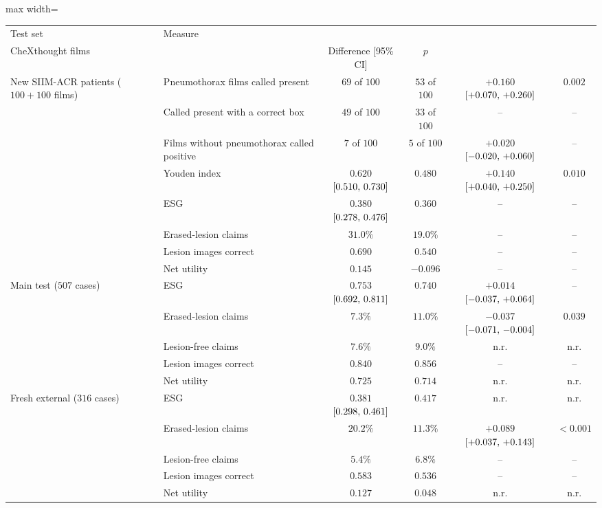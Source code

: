 \begin{table}[!htbp]
\vspace{0.6em}
\begin{adjustbox}{max width=\linewidth}
\begin{tabular}{ll cc cc}
\toprule
Test set & Measure & \shortstack{\msp{} with\\CheXthought films} & \msp{} & Difference [95\% CI] & $p$ \\
\midrule
New SIIM-ACR patients ($100 + 100$ films) & Pneumothorax films called present & $69$ of $100$ & $53$ of $100$ & $+0.160$ $[+0.070,\,+0.260]$ & $0.002$ \\
 & Called present with a correct box & $49$ of $100$ & $33$ of $100$ & -- & -- \\
 & Films without pneumothorax called positive & $7$ of $100$ & $5$ of $100$ & $+0.020$ $[-0.020,\,+0.060]$ & -- \\
 & Youden index & $0.620$ $[0.510,\,0.730]$ & $0.480$ & $+0.140$ $[+0.040,\,+0.250]$ & $0.010$ \\
 & ESG & $0.380$ $[0.278,\,0.476]$ & $0.360$ & -- & -- \\
 & Erased-lesion claims & $31.0\%$ & $19.0\%$ & -- & -- \\
 & Lesion images correct & $0.690$ & $0.540$ & -- & -- \\
 & Net utility & $0.145$ & $-0.096$ & -- & -- \\
\midrule
Main test ($507$ cases) & ESG & $0.753$ $[0.692,\,0.811]$ & $0.740$ & $+0.014$ $[-0.037,\,+0.064]$ & -- \\
 & Erased-lesion claims & $7.3\%$ & $11.0\%$ & $-0.037$ $[-0.071,\,-0.004]$ & $0.039$ \\
 & Lesion-free claims & $7.6\%$ & $9.0\%$ & n.r. & n.r. \\
 & Lesion images correct & $0.840$ & $0.856$ & -- & -- \\
 & Net utility & $0.725$ & $0.714$ & n.r. & n.r. \\
\midrule
Fresh external ($316$ cases) & ESG & $0.381$ $[0.298,\,0.461]$ & $0.417$ & n.r. & n.r. \\
 & Erased-lesion claims & $20.2\%$ & $11.3\%$ & $+0.089$ $[+0.037,\,+0.143]$ & $<0.001$ \\
 & Lesion-free claims & $5.4\%$ & $6.8\%$ & -- & -- \\
 & Lesion images correct & $0.583$ & $0.536$ & -- & -- \\
 & Net utility & $0.127$ & $0.048$ & n.r. & n.r. \\
\bottomrule
\end{tabular}
\end{adjustbox}
\end{table}

